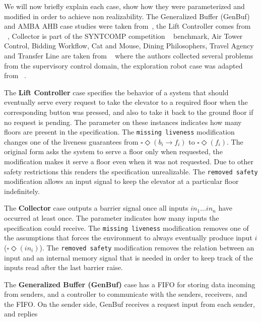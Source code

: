 We will now briefly explain each case, show how they were parameterized and modified in order to achieve non realizability. 
The Generalized Buffer (GenBuf) and AMBA AHB case studies were taken from~\cite{DBLP:conf/hvc/KonighoferHB10}, the Lift Controller comes from ~\cite{DBLP:conf/fmcad/AlurMT13}, Collector is part of the SYNTCOMP competition ~\cite{SYNTCOMP} benchmark, Air Tower Control, Bidding Workflow, Cat and Mouse, Dining Philosophers, Travel Agency and Transfer Line are taken from ~\cite{ciolek2019compositional} where the authors collected several problems from the supervisory control domain, the exploration robot case was adapted from ~\cite{DBLP:journals/corr/abs-2001-07678}.
\begin{description}[align=left,leftmargin=0.7cm,font=\normalfont,style=nextline,itemsep=0pt]
\item[LC] The \textbf{Lift Controller} case specifies the behavior of a system that should eventually serve every request to take the elevator to a required floor when the corresponding button was pressed, and also to take it back to the ground floor if no request is pending. The parameter on these instances indicates how many floors are present in the specification. The \texttt{missing liveness} modification changes one of the liveness guarantees from $\square \Diamond (b_i \rightarrow f_i)$ to $\square \Diamond (f_i)$. The original form asks the system to serve a floor only when requested, the modification makes it serve a floor even when it was not requested. Due to other safety restrictions this renders the specification unrealizable. The \texttt{removed safety} modification allows an input signal to keep the elevator at a particular floor indefinitely.
\item[CO] The \textbf{Collector} case outputs a barrier signal once all inputs $in_1\ldots in_n$ have occurred at least once. The parameter indicates how many inputs the specification could receive. The \texttt{missing liveness} modification removes one of the assumptions that forces the environment to always eventually produce input $i$ ($\square\Diamond(in_i)$). The \texttt{removed safety} modification removes the relation between an input and an internal memory signal that is needed in order to keep track of the inputs read after the last barrier raise.
\item[GB] The \textbf{Generalized Buffer (GenBuf)} case has a FIFO for storing data incoming from senders, and a
controller to communicate with the senders, receivers, and the
FIFO. On the sender side, GenBuf receives a request input from each sender, and replies

\end{description}
